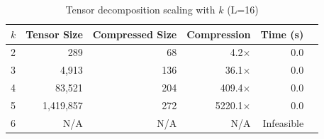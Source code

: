 \begin{table}[htbp]
\centering
\caption{Tensor decomposition scaling with $k$ (L=16)}
\begin{tabular}{lrrrrr}
\hline
$k$ & Tensor Size & Compressed Size & Compression & Time (s) \\
\hline
2 & 289 & 68 & 4.2$\times$ & 0.0 \\
3 & 4,913 & 136 & 36.1$\times$ & 0.0 \\
4 & 83,521 & 204 & 409.4$\times$ & 0.0 \\
5 & 1,419,857 & 272 & 5220.1$\times$ & 0.0 \\
6 & N/A & N/A & N/A & Infeasible \\
\hline
\end{tabular}
\end{table}
